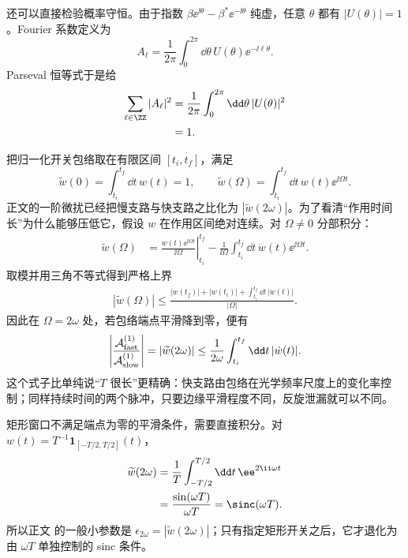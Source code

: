 \begin{derivation}[有限脉冲散射的侧带振幅]
还可以直接检验概率守恒。由于指数
$\beta \ee^{\ii\theta}-\beta^*\ee^{-\ii\theta}$
纯虚，任意 $\theta$ 都有 $|U(\theta)|=1$。Fourier 系数定义为
\begin{equation*}
 A_\ell=\frac{1}{2\pi}
 \int_0^{2\pi}\dd\theta\,
 U(\theta)\ee^{-\ii\ell\theta}.
\end{equation*}
Parseval 恒等式于是给
\begin{align*}
 \sum_{\ell\in\ZZ}|A_\ell|^2
 &=\frac{1}{2\pi}\int_0^{2\pi}\dd\theta\,|U(\theta)|^2\\
 &=1.
\end{align*}
\end{derivation}

\begin{derivation}[快分支振荡与长作用时间条件]
把归一化开关包络取在有限区间 $[t_i,t_f]$，满足
\[
 \widetilde w(0)=\int_{t_i}^{t_f}\dd t\,w(t)=1,
 \qquad
 \widetilde w(\Omega)=\int_{t_i}^{t_f}\dd t\,w(t)\ee^{\ii\Omega t}.
\]
正文的一阶微扰已经把慢支路与快支路之比化为
$|\widetilde w(2\omega)|$。为了看清“作用时间长”为什么能够压低它，假设 $w$ 在作用区间绝对连续。对 $\Omega\ne0$ 分部积分：
\begin{align*}
 \widetilde w(\Omega)
 &=\left.\frac{w(t)\ee^{\ii\Omega t}}{\ii\Omega}\right|_{t_i}^{t_f}
 -\frac1{\ii\Omega}\int_{t_i}^{t_f}\dd t\,
 \dot w(t)\ee^{\ii\Omega t}.
\end{align*}
取模并用三角不等式得到严格上界
\begin{align*}
 |\widetilde w(\Omega)|
 \le\frac{|w(t_f)|+|w(t_i)|
 +\int_{t_i}^{t_f}\dd t\,|\dot w(t)|}{|\Omega|}.
\end{align*}
因此在 $\Omega=2\omega$ 处，若包络端点平滑降到零，便有
\begin{equation*}
 \left|\frac{\mathcal A_{\rm fast}^{(1)}}{\mathcal A_{\rm slow}^{(1)}}\right|
 =|\widetilde w(2\omega)|
 \le\frac{1}{2\omega}
 \int_{t_i}^{t_f}\dd t\,|\dot w(t)|.
\end{equation*}
这个式子比单纯说“$T$ 很长”更精确：快支路由包络在光学频率尺度上的变化率控制；同样持续时间的两个脉冲，只要边缘平滑程度不同，反旋泄漏就可以不同。

矩形窗口不满足端点为零的平滑条件，需要直接积分。对
$w(t)=T^{-1}\mathbf 1_{[-T/2,T/2]}(t)$，
\begin{align*}
 \widetilde w(2\omega)
 &=\frac1T\int_{-T/2}^{T/2}\dd t\,\ee^{2\ii\omega t}\\
 &=\frac{\sin(\omega T)}{\omega T}
 =\sinc(\omega T).
\end{align*}
所以正文 的一般小参数是
$\epsilon_{2\omega}=|\widetilde w(2\omega)|$；只有指定矩形开关之后，它才退化为由 $\omega T$ 单独控制的 sinc 条件。
\end{derivation}
